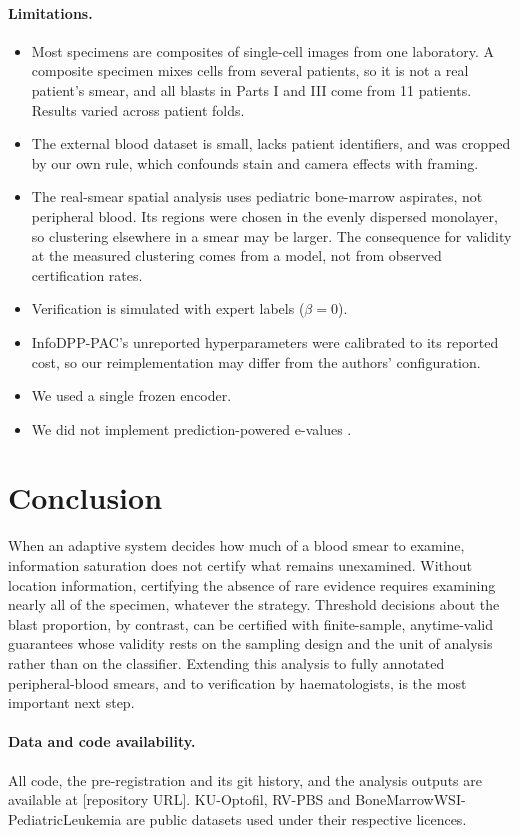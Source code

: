 \documentclass[11pt]{article}
\theoremstyle{remark}
\theoremstyle{definition}
\begin{document}
\paragraph{Limitations.}
\begin{itemize}
\item Most specimens are composites of single-cell images from one laboratory. A composite specimen mixes cells from several patients, so it is not a real patient's smear, and all blasts in Parts I and III come from 11 patients. Results varied across patient folds.
\item The external blood dataset is small, lacks patient identifiers, and was cropped by our own rule, which confounds stain and camera effects with framing.
\item The real-smear spatial analysis uses pediatric bone-marrow aspirates, not peripheral blood. Its regions were chosen in the evenly dispersed monolayer, so clustering elsewhere in a smear may be larger. The consequence for validity at the measured clustering comes from a model, not from observed certification rates.
\item Verification is simulated with expert labels ($\beta=0$).
\item InfoDPP-PAC's unreported hyperparameters were calibrated to its reported cost, so our reimplementation may differ from the authors' configuration.
\item We used a single frozen encoder.
\item We did not implement prediction-powered e-values \cite{csillag2025ppe}.
\end{itemize}

\section{Conclusion}
When an adaptive system decides how much of a blood smear to examine, information saturation does not certify what remains unexamined. Without location information, certifying the absence of rare evidence requires examining nearly all of the specimen, whatever the strategy. Threshold decisions about the blast proportion, by contrast, can be certified with finite-sample, anytime-valid guarantees whose validity rests on the sampling design and the unit of analysis rather than on the classifier. Extending this analysis to fully annotated peripheral-blood smears, and to verification by haematologists, is the most important next step.

\paragraph{Data and code availability.} All code, the pre-registration and its git history, and the analysis outputs are available at [repository URL]. KU-Optofil, RV-PBS and BoneMarrowWSI-PediatricLeukemia are public datasets used under their respective licences.
\end{document}
